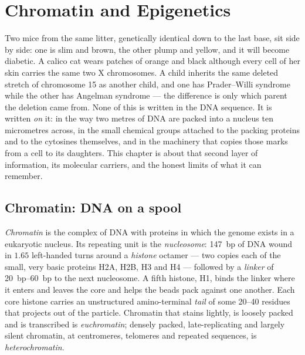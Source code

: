 \chapter{Chromatin and Epigenetics}\label{ch:b3:chromatin-epigenetics}

Two mice from the same litter, genetically identical down to the last
base, sit side by side: one is slim and brown, the other plump and
yellow, and it will become diabetic. A calico cat wears patches of
orange and black although every cell of her skin carries the same two
X chromosomes. A child inherits the same deleted stretch of chromosome
15 as another child, and one has Prader--Willi syndrome while the other
has Angelman syndrome --- the difference is only which parent the
deletion came from. None of this is written in the DNA sequence. It is
written \emph{on} it: in the way two metres of DNA are packed into a
nucleus ten micrometres across, in the small chemical groups attached to
the packing proteins and to the cytosines themselves, and in the
machinery that copies those marks from a cell to its daughters. This
chapter is about that second layer of information, its molecular
carriers, and the honest limits of what it can remember.

\section{Chromatin: DNA on a spool}

\begin{definition}\label{def:b3:chromatin-epigenetics:nucleosome}
\emph{Chromatin} is the complex of DNA with proteins in which the
genome exists in a eukaryotic nucleus. Its repeating unit is the
\emph{nucleosome}: \qty{147}{bp} of DNA wound in $1.65$ left-handed
turns around a \emph{histone} octamer --- two copies each of the small,
very basic proteins H2A, H2B, H3 and H4 --- followed by a
\emph{linker} of \qtyrange{20}{60}{bp} to the next nucleosome. A fifth
histone, H1, binds the linker where it enters and leaves the core and
helps the beads pack against one another. Each core histone carries an
unstructured amino-terminal \emph{tail} of some \numrange{20}{40}
residues that projects out of the particle. Chromatin that stains
lightly, is loosely packed and is transcribed is \emph{euchromatin};
densely packed, late-replicating and largely silent chromatin, at
centromeres, telomeres and repeated sequences, is \emph{heterochromatin}.
\end{definition}

